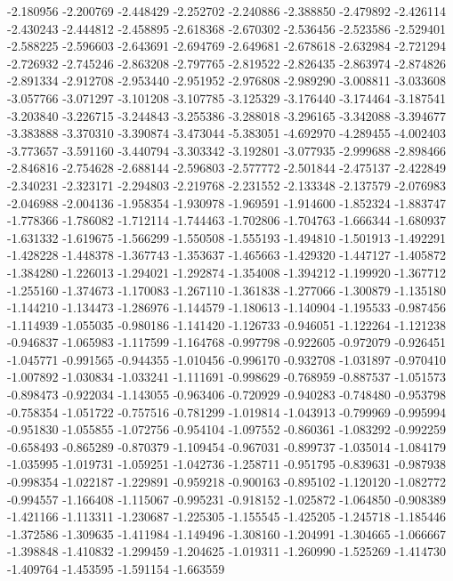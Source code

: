 -2.180956
-2.200769
-2.448429
-2.252702
-2.240886
-2.388850
-2.479892
-2.426114
-2.430243
-2.444812
-2.458895
-2.618368
-2.670302
-2.536456
-2.523586
-2.529401
-2.588225
-2.596603
-2.643691
-2.694769
-2.649681
-2.678618
-2.632984
-2.721294
-2.726932
-2.745246
-2.863208
-2.797765
-2.819522
-2.826435
-2.863974
-2.874826
-2.891334
-2.912708
-2.953440
-2.951952
-2.976808
-2.989290
-3.008811
-3.033608
-3.057766
-3.071297
-3.101208
-3.107785
-3.125329
-3.176440
-3.174464
-3.187541
-3.203840
-3.226715
-3.244843
-3.255386
-3.288018
-3.296165
-3.342088
-3.394677
-3.383888
-3.370310
-3.390874
-3.473044
-5.383051
-4.692970
-4.289455
-4.002403
-3.773657
-3.591160
-3.440794
-3.303342
-3.192801
-3.077935
-2.999688
-2.898466
-2.846816
-2.754628
-2.688144
-2.596803
-2.577772
-2.501844
-2.475137
-2.422849
-2.340231
-2.323171
-2.294803
-2.219768
-2.231552
-2.133348
-2.137579
-2.076983
-2.046988
-2.004136
-1.958354
-1.930978
-1.969591
-1.914600
-1.852324
-1.883747
-1.778366
-1.786082
-1.712114
-1.744463
-1.702806
-1.704763
-1.666344
-1.680937
-1.631332
-1.619675
-1.566299
-1.550508
-1.555193
-1.494810
-1.501913
-1.492291
-1.428228
-1.448378
-1.367743
-1.353637
-1.465663
-1.429320
-1.447127
-1.405872
-1.384280
-1.226013
-1.294021
-1.292874
-1.354008
-1.394212
-1.199920
-1.367712
-1.255160
-1.374673
-1.170083
-1.267110
-1.361838
-1.277066
-1.300879
-1.135180
-1.144210
-1.134473
-1.286976
-1.144579
-1.180613
-1.140904
-1.195533
-0.987456
-1.114939
-1.055035
-0.980186
-1.141420
-1.126733
-0.946051
-1.122264
-1.121238
-0.946837
-1.065983
-1.117599
-1.164768
-0.997798
-0.922605
-0.972079
-0.926451
-1.045771
-0.991565
-0.944355
-1.010456
-0.996170
-0.932708
-1.031897
-0.970410
-1.007892
-1.030834
-1.033241
-1.111691
-0.998629
-0.768959
-0.887537
-1.051573
-0.898473
-0.922034
-1.143055
-0.963406
-0.720929
-0.940283
-0.748480
-0.953798
-0.758354
-1.051722
-0.757516
-0.781299
-1.019814
-1.043913
-0.799969
-0.995994
-0.951830
-1.055855
-1.072756
-0.954104
-1.097552
-0.860361
-1.083292
-0.992259
-0.658493
-0.865289
-0.870379
-1.109454
-0.967031
-0.899737
-1.035014
-1.084179
-1.035995
-1.019731
-1.059251
-1.042736
-1.258711
-0.951795
-0.839631
-0.987938
-0.998354
-1.022187
-1.229891
-0.959218
-0.900163
-0.895102
-1.120120
-1.082772
-0.994557
-1.166408
-1.115067
-0.995231
-0.918152
-1.025872
-1.064850
-0.908389
-1.421166
-1.113311
-1.230687
-1.225305
-1.155545
-1.425205
-1.245718
-1.185446
-1.372586
-1.309635
-1.411984
-1.149496
-1.308160
-1.204991
-1.304665
-1.066667
-1.398848
-1.410832
-1.299459
-1.204625
-1.019311
-1.260990
-1.525269
-1.414730
-1.409764
-1.453595
-1.591154
-1.663559
